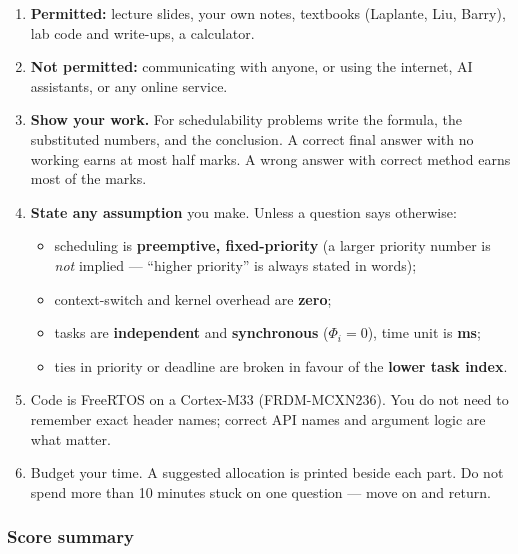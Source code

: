 \documentclass[
  11pt,
]{article}
\providecommand{\tightlist}{%
  \setlength{\itemsep}{0pt}\setlength{\parskip}{0pt}}
\begin{document}
\begin{enumerate}
\def\labelenumi{\arabic{enumi}.}
\tightlist
\item
  \textbf{Permitted:} lecture slides, your own notes, textbooks
  (Laplante, Liu, Barry), lab code and write-ups, a calculator.
\item
  \textbf{Not permitted:} communicating with anyone, or using the
  internet, AI assistants, or any online service.
\item
  \textbf{Show your work.} For schedulability problems write the
  formula, the substituted numbers, and the conclusion. A correct final
  answer with no working earns at most half marks. A wrong answer with
  correct method earns most of the marks.
\item
  \textbf{State any assumption} you make. Unless a question says
  otherwise:

  \begin{itemize}
  \tightlist
  \item
    scheduling is \textbf{preemptive, fixed-priority} (a larger priority
    number is \emph{not} implied --- ``higher priority'' is always
    stated in words);
  \item
    context-switch and kernel overhead are \textbf{zero};
  \item
    tasks are \textbf{independent} and \textbf{synchronous}
    (\(\Phi_i = 0\)), time unit is \textbf{ms};
  \item
    ties in priority or deadline are broken in favour of the
    \textbf{lower task index}.
  \end{itemize}
\item
  Code is FreeRTOS on a Cortex-M33 (FRDM-MCXN236). You do not need to
  remember exact header names; correct API names and argument logic are
  what matter.
\item
  Budget your time. A suggested allocation is printed beside each part.
  Do not spend more than 10 minutes stuck on one question --- move on
  and return.
\end{enumerate}

\subsubsection{Score summary}\label{score-summary}
\end{document}

